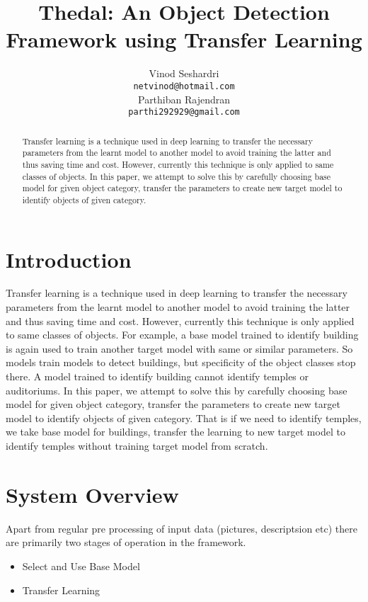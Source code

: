 \documentclass{article}
\title{Thedal: An Object Detection Framework using Transfer Learning}
\author{
  Vinod Seshardri\\
  \texttt{netvinod@hotmail.com} \\
  \And
  Parthiban Rajendran \\
  \texttt{parthi292929@gmail.com}
}
\begin{document}
\maketitle

\begin{abstract}
	
Transfer learning is a technique used in deep learning to transfer the necessary parameters from the learnt model to another model to avoid training the latter and thus saving time and cost. However, currently this technique is only applied to same classes of objects. In this paper, we attempt to solve this by carefully choosing base model for given object category, transfer the parameters to create new target model to identify objects of given category. 

\end{abstract}

\section{Introduction}

Transfer learning is a technique used in deep learning to transfer the necessary parameters from the learnt model to another model to avoid
training the latter and thus saving time and cost. However, currently this technique is only applied to same classes of objects. For example, a base model trained to identify building is again used to train another target model with same or similar parameters. So models train models to detect buildings, but specificity of the object classes stop there. A model trained to identify building cannot identify temples or auditoriums. In this paper, we attempt to solve this by carefully choosing base model for given object category, transfer the parameters to create new target model to identify objects of given category. That is if we need to identify temples, we take base model for buildings, transfer the learning to new target model to identify temples without training target model from scratch. 

\section{System Overview}

Apart from regular pre processing of input data (pictures, descriptsion etc) there are primarily two stages of operation in the framework. 

\begin{itemize}
	\item Select and Use Base Model
	\item Transfer Learning
\end{itemize}
\end{document}
